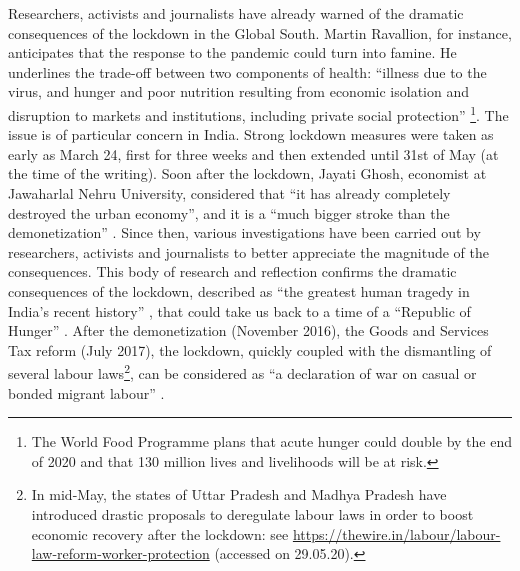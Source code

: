 \documentclass[a4paper, 11pt, onecolumn]{article}
\begin{document}
Researchers, activists and journalists have already warned of the dramatic consequences of the lockdown in the Global South. 
Martin Ravallion, for instance, anticipates that the response to the pandemic could turn into famine. 
He underlines the trade-off between two components of health: “illness due to the virus, and hunger and poor nutrition resulting from economic isolation and disruption to markets and institutions, including private social protection” \citep{Ravallion2020}\footnote{The World Food Programme plans that acute hunger could double by the end of 2020 and that 130 million lives and livelihoods will be at risk.}. 
The issue is of particular concern in India.
Strong lockdown measures were taken as early as March 24, first for three weeks and then extended until 31st of May (at the time of the writing). 
Soon after the lockdown, Jayati Ghosh, economist at Jawaharlal Nehru University, considered that “it has already completely destroyed the urban economy”, and it is a “much bigger stroke than the demonetization” \citep{Thapar2020}. Since then, various investigations have been carried out by researchers, activists and journalists to better appreciate the magnitude of the consequences. This body of research and reflection confirms the dramatic consequences of the lockdown, described as ``the greatest human tragedy in India's recent history'' \citep{Bhagat2020}, that could take us back to a time of a “Republic of Hunger” \citep{Deshpande2020}. After the demonetization (November 2016), the Goods and Services Tax reform (July 2017), the lockdown, quickly coupled with the dismantling of several labour laws\footnote{In mid-May, the states of Uttar Pradesh and Madhya Pradesh have introduced drastic proposals to deregulate labour laws in order to boost economic recovery after the lockdown: see \url{https://thewire.in/labour/labour-law-reform-worker-protection} (accessed on 29.05.20).},  can be considered as “a declaration of war on casual or bonded migrant labour” \citep{Harriss-White2020}.
\end{document}
